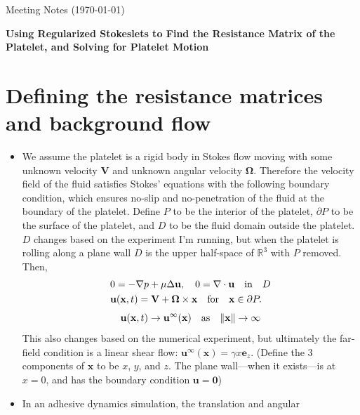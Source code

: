 \documentclass{article}
\newcommand{\tn}{\textnormal}
\newcommand{\vect}[1]{\boldsymbol{\mathbf{#1}}}
\def\R{\mathbb{R}}
\begin{document}
\pagestyle{plain}

\begin{center}
  {\Large Meeting Notes (\today)}
\end{center}

{\Large \textbf{Using Regularized Stokeslets to Find the Resistance
    Matrix of the Platelet, and Solving for Platelet Motion}}

\section{Defining the resistance matrices and background flow}
\label{sec:defin-resist-matr}

\begin{itemize}
\item We assume the platelet is a rigid body in Stokes flow moving
  with some unknown velocity $\vect{V}$ and unknown angular
  velocity $\vect{\Omega}$. Therefore the velocity field of the
  fluid satisfies Stokes' equations with the following boundary
  condition, which ensures no-slip and no-penetration of the fluid at
  the boundary of the platelet. Define $P$ to be the interior of the
  platelet, $\partial P$ to be the surface of the platelet, and $D$ to
  be the fluid domain outside the platelet. $D$ changes based on the
  experiment I'm running, but when the platelet is rolling along a
  plane wall $D$ is the upper half-space of $\R^3$ with $P$
  removed. Then,
  \begin{align}
    & 0 = -\nabla p + \mu \Delta \vect{u}, \quad 0 = \nabla \cdot
      \vect{u} \quad \tn{in} \quad D \label{eq:stokes-u} \\
    & \vect{u}(\vect{x}, t) = \vect{V} +
      \vect{\Omega} \times \vect{x} \quad \tn{for} \quad
      \vect{x} \in \partial P. \label{eq:bdy-u}
  \end{align}
  \begin{equation}
    \vect{u}(\vect{x}, t) \rightarrow
    \vect{u}^\infty(\vect{x}) \quad \tn{as} \quad 
    \|\vect{x}\| \rightarrow \infty \label{eq:ff-u}
  \end{equation}
  This also changes based on the numerical experiment, but ultimately
  the far-field condition is a linear shear flow:
  $\vect{u}^\infty(\vect{x}) = \gamma x
  \vect{e}_z$. (Define the 3 components of $\vect{x}$ to be
  $x$, $y$, and $z$. The plane wall---when it exists---is at $x = 0$,
  and has the boundary condition $\vect{u} = \vect{0}$)
\item In an adhesive dynamics simulation, the translation and angular

\end{itemize}
\end{document}

